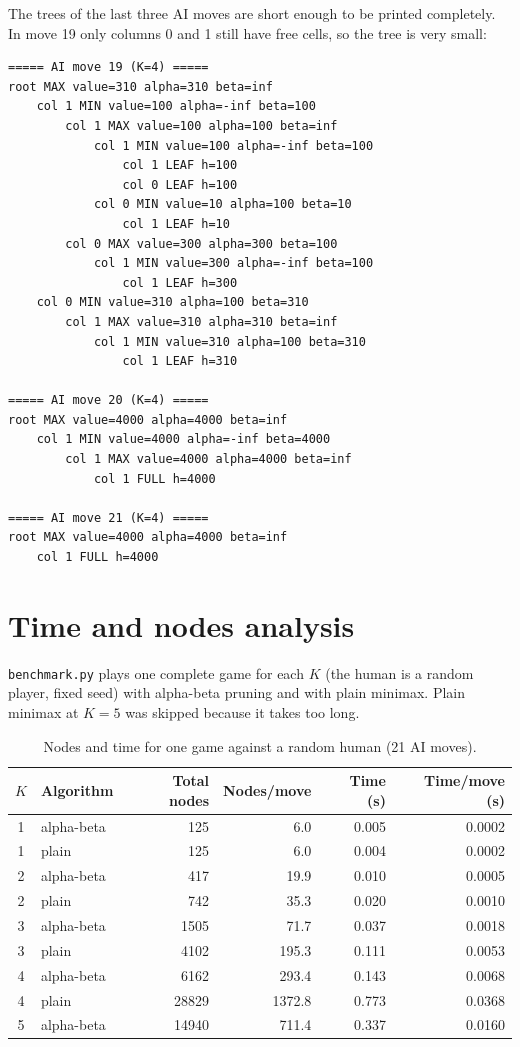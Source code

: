 \documentclass[11pt,a4paper]{article}
\begin{document}
The trees of the last three AI moves are short enough to be printed completely. In move 19
only columns 0 and 1 still have free cells, so the tree is very small:
\begin{lstlisting}
===== AI move 19 (K=4) =====
root MAX value=310 alpha=310 beta=inf
    col 1 MIN value=100 alpha=-inf beta=100
        col 1 MAX value=100 alpha=100 beta=inf
            col 1 MIN value=100 alpha=-inf beta=100
                col 1 LEAF h=100
                col 0 LEAF h=100
            col 0 MIN value=10 alpha=100 beta=10
                col 1 LEAF h=10
        col 0 MAX value=300 alpha=300 beta=100
            col 1 MIN value=300 alpha=-inf beta=100
                col 1 LEAF h=300
    col 0 MIN value=310 alpha=100 beta=310
        col 1 MAX value=310 alpha=310 beta=inf
            col 1 MIN value=310 alpha=100 beta=310
                col 1 LEAF h=310

===== AI move 20 (K=4) =====
root MAX value=4000 alpha=4000 beta=inf
    col 1 MIN value=4000 alpha=-inf beta=4000
        col 1 MAX value=4000 alpha=4000 beta=inf
            col 1 FULL h=4000

===== AI move 21 (K=4) =====
root MAX value=4000 alpha=4000 beta=inf
    col 1 FULL h=4000
\end{lstlisting}

\section{Time and nodes analysis}\label{sec:analysis}
\texttt{benchmark.py} plays one complete game for each $K$ (the human is a random player,
fixed seed) with alpha-beta pruning and with plain minimax. Plain minimax at $K=5$ was
skipped because it takes too long.

\begin{table}[H]
\centering
\begin{tabular}{@{}clrrrr@{}}
\toprule
$K$ & Algorithm & Total nodes & Nodes/move & Time (s) & Time/move (s)\\
\midrule
1 & alpha-beta & 125   & 6.0    & 0.005 & 0.0002\\
1 & plain      & 125   & 6.0    & 0.004 & 0.0002\\
2 & alpha-beta & 417   & 19.9   & 0.010 & 0.0005\\
2 & plain      & 742   & 35.3   & 0.020 & 0.0010\\
3 & alpha-beta & 1505  & 71.7   & 0.037 & 0.0018\\
3 & plain      & 4102  & 195.3  & 0.111 & 0.0053\\
4 & alpha-beta & 6162  & 293.4  & 0.143 & 0.0068\\
4 & plain      & 28829 & 1372.8 & 0.773 & 0.0368\\
5 & alpha-beta & 14940 & 711.4  & 0.337 & 0.0160\\
\bottomrule
\end{tabular}
\caption{Nodes and time for one game against a random human (21 AI moves).}
\label{tab:bench}
\end{table}
\end{document}
